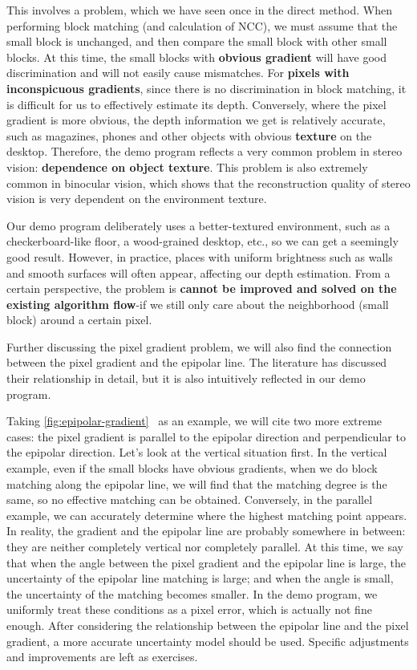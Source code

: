 This involves a problem, which we have seen once in the direct method. When performing block matching (and calculation of NCC), we must assume that the small block is unchanged, and then compare the small block with other small blocks. At this time, the small blocks with \textbf{obvious gradient} will have good discrimination and will not easily cause mismatches. For \textbf{pixels with inconspicuous gradients}, since there is no discrimination in block matching, it is difficult for us to effectively estimate its depth. Conversely, where the pixel gradient is more obvious, the depth information we get is relatively accurate, such as magazines, phones and other objects with obvious \textbf{texture} on the desktop. Therefore, the demo program reflects a very common problem in stereo vision: \textbf{dependence on object texture}. This problem is also extremely common in binocular vision, which shows that the reconstruction quality of stereo vision is very dependent on the environment texture.

Our demo program deliberately uses a better-textured environment, such as a checkerboard-like floor, a wood-grained desktop, etc., so we can get a seemingly good result. However, in practice, places with uniform brightness such as walls and smooth surfaces will often appear, affecting our depth estimation. From a certain perspective, the problem is \textbf{cannot be improved and solved on the existing algorithm flow}-if we still only care about the neighborhood (small block) around a certain pixel.

Further discussing the pixel gradient problem, we will also find the connection between the pixel gradient and the epipolar line. The literature \cite{Engel2013} has discussed their relationship in detail, but it is also intuitively reflected in our demo program.

Taking \autoref{fig:epipolar-gradient}~ as an example, we will cite two more extreme cases: the pixel gradient is parallel to the epipolar direction and perpendicular to the epipolar direction. Let's look at the vertical situation first. In the vertical example, even if the small blocks have obvious gradients, when we do block matching along the epipolar line, we will find that the matching degree is the same, so no effective matching can be obtained. Conversely, in the parallel example, we can accurately determine where the highest matching point appears. In reality, the gradient and the epipolar line are probably somewhere in between: they are neither completely vertical nor completely parallel. At this time, we say that when the angle between the pixel gradient and the epipolar line is large, the uncertainty of the epipolar line matching is large; and when the angle is small, the uncertainty of the matching becomes smaller. In the demo program, we uniformly treat these conditions as a pixel error, which is actually not fine enough. After considering the relationship between the epipolar line and the pixel gradient, a more accurate uncertainty model should be used. Specific adjustments and improvements are left as exercises.

